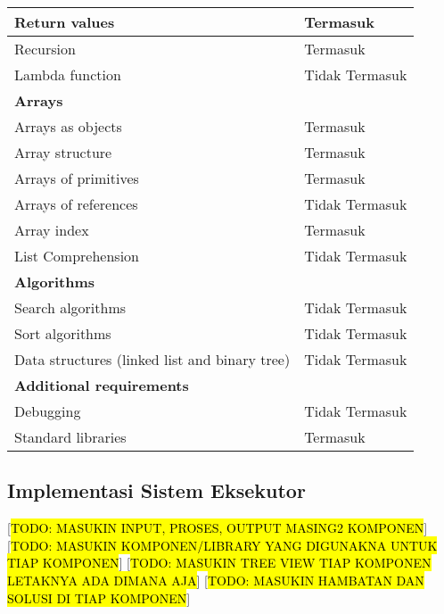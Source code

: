 \begin{longtable}[c]{|l|l|}
  Return values                                 & Termasuk                           \\ \hline
  Recursion                                     & Termasuk                           \\ \hline
  Lambda function                               & Tidak Termasuk                     \\ \hline
  \textbf{Arrays}                               &                                    \\ \hline
  Arrays as objects                             & Termasuk                           \\ \hline
  Array structure                               & Termasuk                           \\ \hline
  Arrays of primitives                          & Termasuk                           \\ \hline
  Arrays of references                          & Tidak Termasuk                     \\ \hline
  Array index                                   & Termasuk                           \\ \hline
  List Comprehension                            & Tidak Termasuk                     \\ \hline
  \textbf{Algorithms}                           &                                    \\ \hline
  Search algorithms                             & Tidak Termasuk                     \\ \hline
  Sort algorithms                               & Tidak Termasuk                     \\ \hline
  Data structures (linked list and binary tree) & Tidak Termasuk                     \\ \hline
  \textbf{Additional requirements}              &                                    \\ \hline
  Debugging                                     & Tidak Termasuk                     \\ \hline
  Standard libraries                            & Termasuk                           \\ \hline
\end{longtable}
\normalsize

\subsection{Implementasi Sistem Eksekutor}
[\hl{TODO: MASUKIN INPUT, PROSES, OUTPUT MASING2 KOMPONEN}]
[\hl{TODO: MASUKIN KOMPONEN/LIBRARY YANG DIGUNAKNA UNTUK TIAP KOMPONEN}]
[\hl{TODO: MASUKIN TREE VIEW TIAP KOMPONEN LETAKNYA ADA DIMANA AJA}]
[\hl{TODO: MASUKIN HAMBATAN DAN SOLUSI DI TIAP KOMPONEN}]

